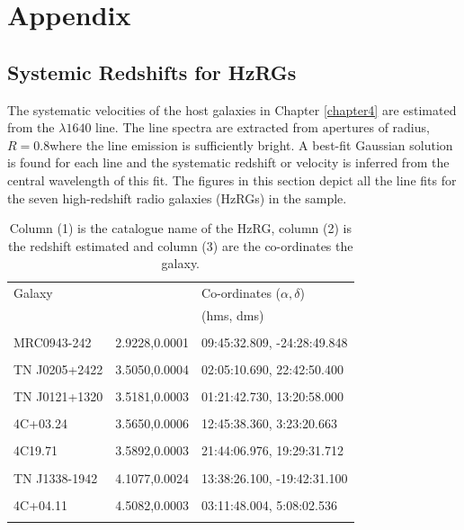 \chapter[Appendix]{Appendix}

\section*{Systemic Redshifts for HzRGs}

\begin{appendix}
The systematic velocities of the host galaxies in Chapter \ref{chapter4} are estimated from the  $\lambda1640$ line. The line spectra are extracted from apertures of radius, $R=0.8$\arcsec where the  line emission is sufficiently bright. A best-fit Gaussian solution is found for each line and the systematic redshift or velocity is inferred from the central wavelength of this fit. The figures in this section depict all the  line fits for the seven high-redshift radio galaxies (HzRGs) in the sample. 

\begin{table}
  \centering
  \caption[{HzRG sample redshifts and co-ordinates}]{Column (1) is the catalogue name of the HzRG, column (2) is the redshift estimated and column (3) are the co-ordinates the galaxy.}
  \label{table:hzrg-sample-chp4}
  \begin{tabular}{ l D{,}{\,\,\pm\,\,}{-3} l }
  & & \mc{} \\
   \hline \hline
  Galaxy & 
   & 
  Co-ordinates ($\alpha, \delta$) \\
  & & (hms, dms) \\
  & & \mc{} \\
 \hline
MRC0943-242 		& 2.9228,0.0001	& 09:45:32.809, -24:28:49.848	 \\ 
  & & \mc{} \\
TN J0205+2422 		& 3.5050,0.0004 		& 02:05:10.690, 22:42:50.400	 \\ 
  & & \mc{} \\
TN J0121+1320		& 3.5181,0.0003 	 	& 01:21:42.730, 13:20:58.000	  \\
  & & \mc{} \\
4C+03.24 			& 3.5650,0.0006		& 12:45:38.360, 3:23:20.663   \\
  & & \mc{} \\
4C19.71				& 3.5892,0.0003 		& 21:44:06.976, 19:29:31.712	 \\	
  & & \mc{} \\	
TN J1338-1942		& 4.1077,0.0024		& 13:38:26.100, -19:42:31.100	  \\ 	
  & & \mc{} \\		
4C+04.11 			& 4.5082,0.0003 		& 03:11:48.004, 5:08:02.536	 \\ 
  & & \mc{} \\
 \hline
  \end{tabular}
\end{table}


\end{appendix}

